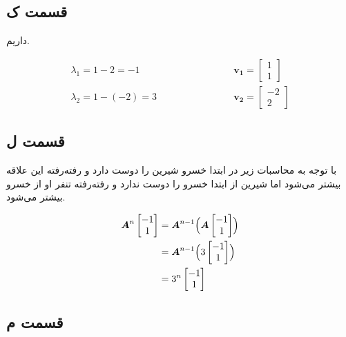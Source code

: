 \documentclass[14pt,a4]{article}
\begin{document}
\subsection*{قسمت ک}

داریم.

\begin{align*}
    \lambda_1 = 1 - 2 = -1  & \hspace{3cm} \boldsymbol{v_1} = \begin{bmatrix} 1 \\ 1 \end{bmatrix}
    \\
    \lambda_2  =  1 - (-2) = 3  & \hspace{3cm} \boldsymbol{v_2} = \begin{bmatrix} -2 \\ 2\end{bmatrix}
\end{align*}

\subsection*{قسمت ل}

با توجه به محاسبات زیر در ابتدا خسرو شیرین را دوست دارد و رفته‌رفته این علاقه بیشتر می‌شود
اما شیرین از ابتدا خسرو را دوست ندارد و رفته‌رفته تنفر او از خسرو بیشتر می‌شود.

\begin{align*}
    \boldsymbol{A}^n \begin{bmatrix} -1 \\ 1 \end{bmatrix} & = \boldsymbol{A}^{n-1} \Bigl(\boldsymbol{A}\begin{bmatrix} -1 \\ 1 \end{bmatrix}\Bigr) \\
     & = \boldsymbol{A}^{n-1} \Bigl(3\begin{bmatrix} -1 \\ 1 \end{bmatrix}\Bigr) \\
     & = 3^{n}\begin{bmatrix} -1 \\ 1 \end{bmatrix}
\end{align*}

\subsection*{قسمت م}
\end{document}
